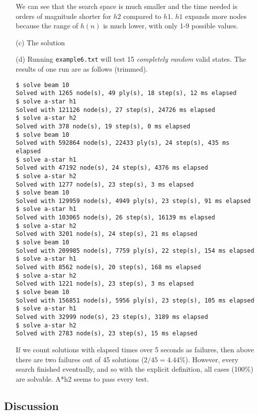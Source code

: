 \documentclass[letterpaper]{article}
\begin{document}
\begin{itemize}
    We can see that the search space is much smaller and the time needed
    is orders of magnitude shorter for $h2$ compared to $h1$. $h1$ expands more
    nodes because the range of $h(n)$ is much lower, with only 1-9 possible values.
    \item[(c)]
    The solution 
    \item[(d)]
    Running \texttt{example6.txt} will test 15 \textit{completely random} valid
    states. The results of one run are as follows (trimmed).
\begin{verbatim}
$ solve beam 10
Solved with 1265 node(s), 49 ply(s), 18 step(s), 12 ms elapsed
$ solve a-star h1
Solved with 121126 node(s), 27 step(s), 24726 ms elapsed
$ solve a-star h2
Solved with 378 node(s), 19 step(s), 0 ms elapsed
$ solve beam 10
Solved with 592864 node(s), 22433 ply(s), 24 step(s), 435 ms elapsed
$ solve a-star h1
Solved with 47192 node(s), 24 step(s), 4376 ms elapsed
$ solve a-star h2
Solved with 1277 node(s), 23 step(s), 3 ms elapsed
$ solve beam 10
Solved with 129959 node(s), 4949 ply(s), 23 step(s), 91 ms elapsed
$ solve a-star h1
Solved with 103065 node(s), 26 step(s), 16139 ms elapsed
$ solve a-star h2
Solved with 3201 node(s), 24 step(s), 21 ms elapsed
$ solve beam 10
Solved with 209985 node(s), 7759 ply(s), 22 step(s), 154 ms elapsed
$ solve a-star h1
Solved with 8562 node(s), 20 step(s), 168 ms elapsed
$ solve a-star h2
Solved with 1221 node(s), 23 step(s), 3 ms elapsed
$ solve beam 10
Solved with 156851 node(s), 5956 ply(s), 23 step(s), 105 ms elapsed
$ solve a-star h1
Solved with 32999 node(s), 23 step(s), 3189 ms elapsed
$ solve a-star h2
Solved with 2783 node(s), 23 step(s), 15 ms elapsed
\end{verbatim}
    If we count solutions with elapsed times over 5 seconds as failures, then
    above there are two failures out of 45 solutions ($2/45=4.44\%$). However,
    every search finished eventually, and so with the explicit definition,
    all cases (100\%) are solvable. A*h2 seems to pass every test.
\end{itemize}

\subsection*{Discussion}
\end{document}
